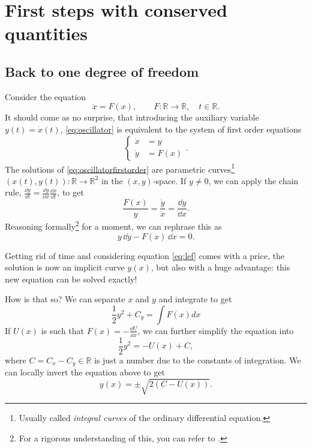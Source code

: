 \documentclass[english,fontsize=11pt,paper=b5]{scrbook}
\theoremstyle{definition}
\begin{document}
    \section{First steps with conserved quantities}
    \subsection{Back to one degree of freedom}\label{sec:bdf}

    Consider the equation
    \begin{equation}\label{eq:oscillator}
      \ddot x = F(x), \qquad F:\mathbb{R}\to\mathbb{R}, \quad t\in \mathbb{R}.
    \end{equation}
    It should come as no surprise, that introducing the auxiliary variable $y(t) = \dot x(t)$, \eqref{eq:oscillator} is equivalent to the system of first order equations
    \begin{equation}\label{eq:oscillatorfirstorder}
      \left\lbrace
        \begin{aligned}
          \dot x & = y    \\
          \dot y & = F(x)
        \end{aligned}
      \right..
    \end{equation}
    The solutions of \eqref{eq:oscillatorfirstorder} are parametric curves\footnote{Usually called \emph{integral curves} of the ordinary differential equation.} $(x(t),y(t)):\mathbb{R}\to\mathbb{R}^2$ in the $(x,y)$-space.
    If $y\neq0$, we can apply the chain rule, $\frac{\dd y}{\dd t} = \frac{\dd y}{\dd x} \frac{\dd x}{\dd t}$, to get
    \begin{equation}\label{eq:lef}
      \frac{F(x)}y = \frac{\dot y}{\dot x} = \frac{\dd y}{\dd x}.
    \end{equation}
    Reasoning formally\footnote{For a rigorous understanding of this, you can refer to \cite[Equation (5.1) with $f=y$ and Remark 5.1.3]{lectures:aom:seri}.} for a moment, we can rephrase this as
    \begin{equation}
      y\,\dd y - F(x)\, \dd x = 0.
    \end{equation}

    Getting rid of time and considering equation \eqref{eq:lef} comes with a price, the solution is now an implicit curve $y(x)$, but also with a huge advantage: this new equation can be solved exactly!

    How is that so? We can separate $x$ and $y$ and integrate to get
    \begin{equation}
      \frac12 y^2 + C_y = \int F(x) dx
    \end{equation}
    If $U(x)$ is such that $F(x) = -\frac{\dd U}{\dd x}$, we can further simplify the equation into
    \begin{equation}
      \frac12 y^2 = -U(x) + C,
    \end{equation}
    where $C = C_x - C_y \in\mathbb{R}$ is just a number due to the constants of integration.
    We can locally invert the equation above to get
    \begin{equation}
      y(x) = \pm \sqrt{2(C-U(x))}.
    \end{equation}
\end{document}
